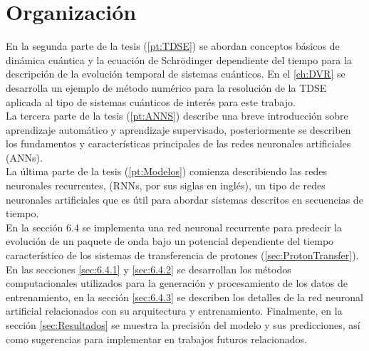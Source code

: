 \section{Organización}

En la segunda parte de la tesis (\autoref{pt:TDSE}) se abordan conceptos básicos de dinámica cuántica y la ecuación de Schrödinger dependiente del tiempo para la descripción de la evolución temporal de sistemas cuánticos. En el \autoref{ch:DVR} se desarrolla un ejemplo de método numérico para la resolución de la \acs{TDSE} aplicada al tipo de sistemas cuánticos de interés para este trabajo.\\

La tercera parte de la tesis (\autoref{pt:ANNS}) describe una breve introducción sobre aprendizaje automático y aprendizaje supervisado, posteriormente se describen los fundamentos y características principales de las redes neuronales artificiales (\acs{ANN}s).\\


La última parte de la tesis (\autoref{pt:Modelos}) comienza describiendo las redes neuronales recurrentes, (\acs{RNN}s, por sus siglas en inglés), un tipo de redes neuronales artificiales que es útil para abordar sistemas descritos en secuencias de tiempo.\\
En la sección 6.4 se implementa una red neuronal recurrente para predecir la evolución de un paquete de onda bajo un potencial dependiente del tiempo característico de los sistemas de transferencia de protones (\autoref{sec:ProtonTransfer}). En las secciones \autoref{sec:6.4.1} y \autoref{sec:6.4.2} se desarrollan los métodos computacionales utilizados para la generación y procesamiento de los datos de entrenamiento, en la sección \autoref{sec:6.4.3} se describen los detalles de la red neuronal artificial relacionados con su arquitectura y entrenamiento. Finalmente, en la sección \autoref{sec:Resultados} se muestra la precisión del modelo y sus predicciones, así como sugerencias para implementar en trabajos futuros relacionados.








